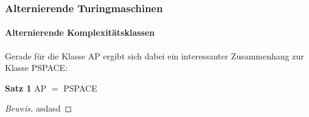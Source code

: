 \begin{frame}
    \frametitle{Alternierende Turingmaschinen}
    \framesubtitle{Alternierende Komplexitätsklassen}
    
    Gerade für die Klasse AP ergibt sich dabei ein interessanter Zusammenhang zur Klasse PSPACE:

    \begin{block}{\textbf{Satz 1}}
        AP $=$ PSPACE
    \end{block}

    \begin{proof}[Beweis]
        asdasd
    \end{proof}

\end{frame}